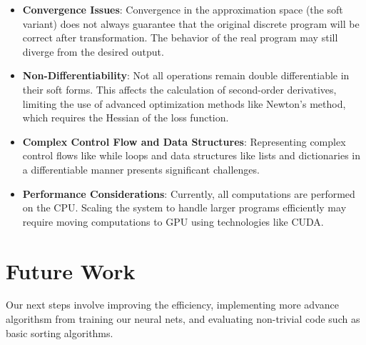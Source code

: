 \documentclass{article}
\begin{document}
\begin{itemize}
    \item \textbf{Convergence Issues}: Convergence in the approximation space (the soft variant) does not always guarantee that the original discrete program will be correct after transformation. The behavior of the real program may still diverge from the desired output.

    \item \textbf{Non-Differentiability}: Not all operations remain double differentiable in their soft forms. This affects the calculation of second-order derivatives, limiting the use of advanced optimization methods like Newton's method, which requires the Hessian of the loss function.

    \item \textbf{Complex Control Flow and Data Structures}: Representing complex control flows like while loops and data structures like lists and dictionaries in a differentiable manner presents significant challenges.

    \item \textbf{Performance Considerations}: Currently, all computations are performed on the CPU. Scaling the system to handle larger programs efficiently may require moving computations to GPU using technologies like CUDA.
\end{itemize}

\section{Future Work}

Our next steps involve improving the efficiency, implementing more advance algorithsm from training our neural nets, and evaluating non-trivial code such as basic sorting algorithms.
\end{document}
